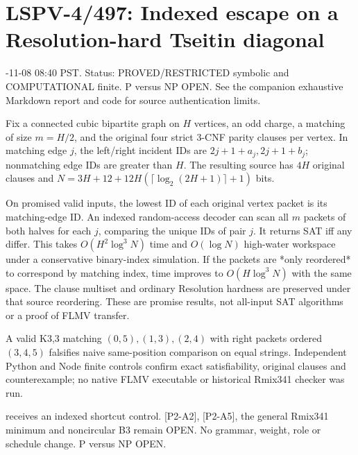 \documentclass[11pt]{article}
\begin{document}
\section*{LSPV-4/497: Indexed escape on a Resolution-hard Tseitin diagonal}
-11-08 08:40 PST. Status: PROVED/RESTRICTED symbolic and COMPUTATIONAL finite. P versus NP OPEN. See the companion exhaustive Markdown report and code for source authentication limits.
\par
Fix a connected cubic bipartite graph on $H$ vertices, an odd charge, a matching of size $m=H/2$, and the original four strict 3-CNF parity clauses per vertex. In matching edge $j$, the left/right incident IDs are $2j+1+a_j,2j+1+b_j$; nonmatching edge IDs are greater than $H$. The resulting source has $4H$ original clauses and $N=3H+12+12H(\lceil\log_2(2H+1)\rceil+1)$ bits.
\par
On promised valid inputs, the lowest ID of each original vertex packet is its matching-edge ID. An indexed random-access decoder can scan all $m$ packets of both halves for each $j$, comparing the unique IDs of pair $j$. It returns SAT iff any differ. This takes $O(H^2\log^3N)$ time and $O(\log N)$ high-water workspace under a conservative binary-index simulation. If the packets are *only reordered* to correspond by matching index, time improves to $O(H\log^3N)$ with the same space. The clause multiset and ordinary Resolution hardness are preserved under that source reordering. These are promise results, not all-input SAT algorithms or a proof of FLMV transfer. 
\par
A valid K3,3 matching $(0,5),(1,3),(2,4)$ with right packets ordered $(3,4,5)$ falsifies naive same-position comparison on equal strings. Independent Python and Node finite controls confirm exact satisfiability, original clauses and counterexample; no native FLMV executable or historical Rmix341 checker was run.
\par
[P2-A4] receives an indexed shortcut control. [P2-A2], [P2-A5], the general Rmix341 minimum and noncircular B3 remain OPEN. No grammar, weight, role or schedule change. P versus NP OPEN.
\end{document}
